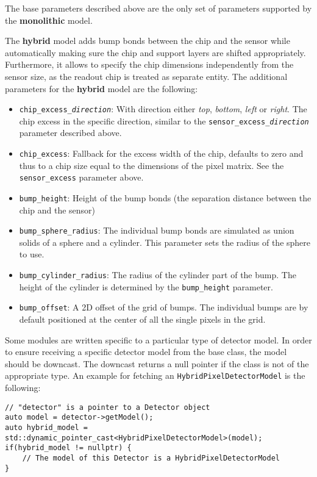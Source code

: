 The base parameters described above are the only set of parameters supported by the \textbf{monolithic} model.

The \textbf{hybrid} model adds bump bonds between the chip and the sensor while automatically making sure the chip and support layers are shifted appropriately.
Furthermore, it allows to specify the chip dimensions independently from the sensor size, as the readout chip is treated as separate entity.
The additional parameters for the \textbf{hybrid} model are the following:
\begin{itemize}
\item \texttt{chip\_excess\_\textit{direction}}: With direction either \textit{top}, \textit{bottom}, \textit{left} or \textit{right}.
The chip excess in the specific direction, similar to the \texttt{sensor\_excess\_\textit{direction}} parameter described above.
\item \texttt{chip\_excess}: Fallback for the excess width of the chip, defaults to zero and thus to a chip size equal to the dimensions of the pixel matrix.
See the \texttt{sensor\_excess} parameter above.
\item \texttt{bump\_height}: Height of the bump bonds (the separation distance between the chip and the sensor)
\item \texttt{bump\_sphere\_radius}: The individual bump bonds are simulated as union solids of a sphere and a cylinder.
This parameter sets the radius of the sphere to use.
\item \texttt{bump\_cylinder\_radius}: The radius of the cylinder part of the bump.
The height of the cylinder is determined by the \texttt{bump\_height} parameter.
\item \texttt{bump\_offset}: A 2D offset of the grid of bumps.
The individual bumps are by default positioned at the center of all the single pixels in the grid.
\end{itemize}

Some modules are written specific to a particular type of detector model.
In order to ensure receiving a specific detector model from the base class, the model should be downcast.
 The downcast returns a null pointer if the class is not of the appropriate type.
An example for fetching an \texttt{HybridPixelDetectorModel} is the following:
\begin{verbatim}
// "detector" is a pointer to a Detector object
auto model = detector->getModel();
auto hybrid_model = std::dynamic_pointer_cast<HybridPixelDetectorModel>(model);
if(hybrid_model != nullptr) {
    // The model of this Detector is a HybridPixelDetectorModel
}
\end{verbatim}

